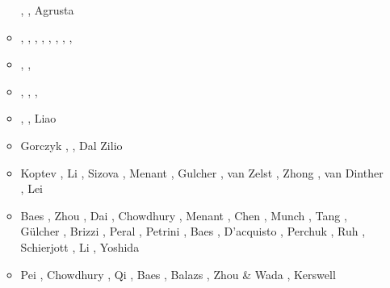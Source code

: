 \begin{itemize}
\begin{scriptsize}
\begin{itemize}
                            \cite{gery13}\cite{milp13},
                            \cite{rugb13}\cite{scdg13},
                            Agrusta \etal \cite{agat13}
\item[\twothousandfourteen] \cite{dugs14}\cite{puge14},
                            \cite{voge14b}\cite{bagb14},
                            \cite{lige14}\cite{stjm14},
                            \cite{malg14}\cite{buge14},
                            \cite{gosk14}\cite{vamd14},
                            \cite{macg14}\cite{basc14},
                            \cite{gobg14}\cite{gery14},
                            \cite{gery14b}\cite{gita14},
                            \cite{sigb14}
\item[\twothousandfifteen] \cite{uewg15}\cite{rula15},
                           \cite{gesb15}\cite{rula15},
                           \cite{kocb15}\cite{hevg15}
\item[\twothousandsixteen] \cite{kobc16}\cite{magc16},
                           \cite{fige16}\cite{mauw16},
                           \cite{duay16}\cite{mesj16},
                           \cite{huwc16}\cite{staj16}
\item[\twothousandseventeen] \cite{mauw17}\cite{kocb17},
                             \cite{vomc17}\cite{shwl17}, 
                             Liao \etal \cite{liwg17}
\item[\twothousandeighteen] Gorczyk \etal \cite{gomb18}, \cite{zhlg18}
                            \cite{masg18}\cite{gebu18}
                            \cite{hegv18}, Dal Zilio \etal \cite{davg18}
\item[\twothousandnineteen] Koptev \etal \cite{kobg19}, Li \etal \cite{ligc19},
                      Sizova \etal \cite{sihf19}, Menant \etal \cite{meag19},
                      Gulcher \etal \cite{gubg19}, van Zelst \etal \cite{vawg19},
                      Zhong \etal \cite{zhli19}, van Dinther \etal \cite{vakf19},
                      Lei \etal \cite{lell19}
\item[\twothousandtwenty] Baes \etal \cite{basg20}, Zhou \etal \cite{zhlg20}, 
                    Dai \etal \cite{dawl20}, Chowdhury \etal \cite{chcg20},
                    Menant \etal \cite{meag20}, Chen \etal \cite{chlc20}, Munch \etal \cite{mugu20}, 
                    Tang \etal \cite{tacm20}, G{\"u}lcher \etal \cite{gugm20}, Brizzi \etal \cite{brvf20}, 
                    Peral \etal \cite{perz20}, Petrini \etal \cite{pegy20}, 
                    Baes \etal \cite{basg20b}, D'acquisto \etal \cite{dadm20},
                    Perchuk \etal \cite{pegz20}, Ruh \cite{ruh20}, Schierjott \etal \cite{sctr20},
                    Li \etal \cite{lisy20}, Yoshida \etal \cite{yosy20b}
\item[\twothousandtwentyone]  Pei \etal \cite{pels21}, Chowdhury \etal \cite{chcg21},
                              Qi \etal \cite{qill21}, Baes \etal \cite{basg21}, 
                              Balazs \etal \cite{bafu21}, Zhou \& Wada \cite{zhwa21},
                              Kerswell \etal \cite{kekg21}
\end{itemize}
\end{scriptsize}



\end{itemize}
